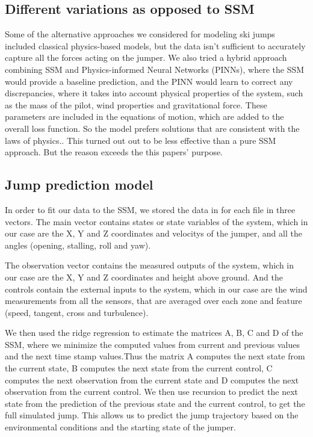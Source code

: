 \documentclass[sigconf,natbib=false, language=english]{acmart}
\begin{document}
\subsection{Different variations as opposed to SSM}

Some of the alternative approaches we considered for modeling ski jumps included classical
physics-based models, but the data  isn't sufficient to accurately capture all the forces acting on the jumper.
We also tried a hybrid approach combining SSM and Physics-informed Neural Networks (PINNs), where
the SSM would provide a baseline prediction, and the PINN would learn to correct any discrepancies, where it takes into
account physical properties of the system, such as the mass of the pilot, wind properties and gravitational force. 
These parameters are included in the equations of motion, which are added to the overall loss function. 
So the model prefers solutions that are consistent with the laws of physics.. This
turned out out to be less effective than a pure SSM approach. But the reason exceeds the this papers' purpose.

\subsection{Jump prediction model}

In order to fit our data to the SSM, we stored the data in for each file in three vectors.
The main vector contains states or state variables of the system, which in our case are the
X, Y and Z coordinates and velocitys of the jumper, and all the angles (opening, stalling, roll and yaw).

The observation vector contains the measured outputs of the system, which in our case are the X, Y and Z coordinates
and height above ground. And the controls contain the external inputs to the system, which in our case are
the wind measurements from all the sensors, that are averaged over each zone and feature (speed, tangent, cross and turbulence).

We then used the ridge regression to estimate the matrices A, B, C and D of the SSM, where we minimize the computed values from current
and previous values and the next time stamp values.Thus the matrix A computes the next state from the current state, 
B computes the next state from the current control, C computes the next observation from the current state and D computes 
the next observation from the current control. We then use recursion to predict the next state from the prediction of the 
previous state and the current control, to get the full simulated jump. This allows us to predict the jump trajectory 
based on the environmental conditions and the starting state of the jumper.
\end{document}
